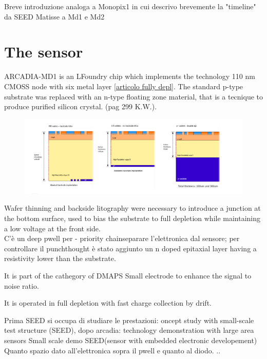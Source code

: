 \cite{ARCADIA-Pancheri}
\cite{ARCADIA-Pancheri2}

Breve introduzione analoga a Monopix1 in cui descrivo brevemente la "timeline" da SEED Matisse a Md1 e Md2

\section{The sensor}
    ARCADIA-MD1 is an LFoundry chip which implements the technology 110 nm CMOSS node
    with six metal layer \ref{articolo fully depl}.
    The standard p-type substrate was replaced with an n-type floating zone material,
    that is a tecnique to produce purified silicon crystal. (pag 299 K.W.).\\
    \begin{figure}[h!]
        \centering
        \includegraphics[width=.8\linewidth]{figures/ARCADIA/ARCADIA_substrate.png}
        \caption{}
        \label{fig:ARCADIA_substrate}
    \end{figure}

    Wafer thinning and backside litography were necessary to introduce a junction
    at the bottom surface, used to bias the substrate to full depletion while
    maintaining a low voltage at the front side.  \\
    C'è un deep pwell per - priority chainseparare l'elettronica dal sensore; per controllare il punchthought
    è stato aggiunto un n doped epitaxial layer having a resistivity lower than the substrate.



    It is part of the cathegory of DMAPS
    Small electrode to enhance the signal to noise ratio.

    It is operated in full depletion with fast charge collection by drift.

    Prima SEED si occupa di studiare le prestazioni: oncept study with small-scale test structure (SEED),
    dopo arcadia: technology demonstration with large area sensors
    Small scale demo SEED(sensor with embedded electronic developement)
    Quanto spazio dato all'elettronica sopra il pwell e quanto al diodo. ..

